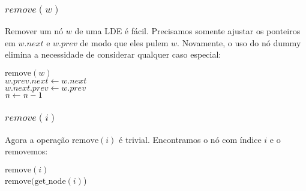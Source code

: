 \documentclass{beamer}
\begin{document}
\begin{frame}
\frametitle{$remove(w)$}
Remover um nó $ \ensuremath{\ensuremath{\mathit{w}}}$ de uma LDE é fácil. Precisamos somente ajustar os ponteiros em $ \ensuremath{\ensuremath{\mathit{w}}.\ensuremath{\mathit{next}}}$ e $ \ensuremath{\ensuremath{\mathit{w}}.\ensuremath{\mathit{prev}}}$ de modo que eles pulem $ \ensuremath{\ensuremath{\mathit{w}}}$. Novamente, o uso do nó dummy  elimina a necessidade de considerar qualquer caso especial:

\begin{oframed}
\begin{flushleft}
\hspace*{1em} \ensuremath{\mathrm{remove}(\ensuremath{\mathit{w}})}\\
\hspace*{1em} \hspace*{1em} \ensuremath{\ensuremath{\mathit{w}}.\ensuremath{\ensuremath{\mathit{prev}}.next} \gets  \ensuremath{\ensuremath{\mathit{w}}.next}}\\
\hspace*{1em} \hspace*{1em} \ensuremath{\ensuremath{\mathit{w}}.\ensuremath{\ensuremath{\mathit{next}}.prev} \gets  \ensuremath{\ensuremath{\mathit{w}}.prev}}\\
\hspace*{1em} \hspace*{1em} \ensuremath{\ensuremath{\mathit{n}} \gets  \ensuremath{\ensuremath{\mathit{n}} - 1}\hspace*{1em} }\\
\end{flushleft}
\end{oframed}
\end{frame} 

\begin{frame}
\frametitle{$remove(i)$}
Agora a operação  \ensuremath{\ensuremath{\mathrm{remove}(\ensuremath{\mathit{i}})}} é trivial. Encontramos o nó com índice  \ensuremath{\ensuremath{\ensuremath{\mathit{i}}}} e o removemos:

\begin{oframed}
\begin{flushleft}
\hspace*{1em} \ensuremath{\mathrm{remove}(\ensuremath{\mathit{i}})}\\

\hspace*{1em} \hspace*{1em} \ensuremath{\mathrm{remove}(\mathrm{get\_node}(\ensuremath{\mathit{i}})})\\
\end{flushleft}
\end{oframed}
\end{frame}
\end{document}
